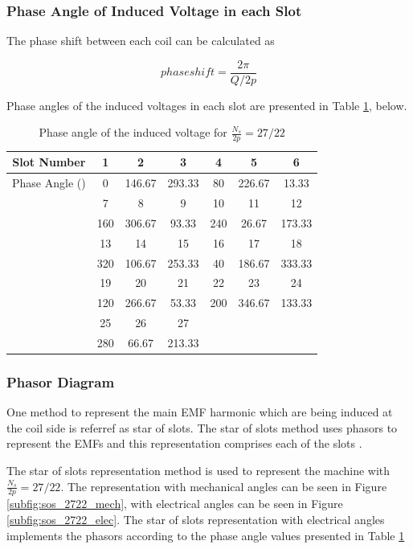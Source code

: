 \documentclass[a4paper, 11pt]{article}
\begin{document}
\subsubsection{Phase Angle of Induced Voltage in each Slot}

The phase shift between each coil can be calculated as

\begin{equation}
phase shift=\frac{2\pi}{Q/2p}
\end{equation}

Phase angles of the induced voltages in each slot are presented in Table \ref{tab:ph_ang_2722}, below.

\begin{table}[h!]
\centering
	\begin{tabular}{||c|| c c c c c c||} 
		\hline\hline
		Slot Number & 1 & 2 & 3 & 4 & 5 & 6\\ [0.5ex] 
		\hline
		Phase Angle (\degree) & 0 & 146.67 & 293.33 & 80 & 226.67 & 13.33\\ 
		\hline\hline
		& 7 & 8 & 9 & 10 & 11 & 12\\
		\hline
		& 160 & 306.67 & 93.33 & 240 & 26.67 & 173.33\\
		\hline\hline
		& 13 & 14 & 15 & 16 & 17 & 18\\
		\hline
		& 320 & 106.67 & 253.33 & 40 & 186.67 & 333.33\\
	 	\hline\hline
		& 19 & 20 & 21 & 22 & 23 & 24\\
		\hline
		& 120 & 266.67 & 53.33 & 200 & 346.67 & 133.33\\
		\hline\hline
		& 25 & 26 & 27\\
		\hline
		& 280 & 66.67 & 213.33\\
		\hline\hline
	\end{tabular}
	\caption{Phase angle of the induced voltage for $\frac{N_s}{2p}=27/22$}
	\label{tab:ph_ang_2722}
\end{table}


\subsubsection{Phasor Diagram}
\label{subsubsec:phasor_d_2722}

One method to represent the main EMF harmonic which are being induced at the coil side is referref as star of slots. The star of slots method uses phasors to represent the EMFs and this representation comprises each of the slots \cite{bianchi}.

The star of slots representation method is used to represent the machine with $\frac{N_s}{2p}=27/22$. The representation with mechanical angles can be seen in Figure \ref{subfig:sos_2722_mech}, with electrical angles can be seen in Figure \ref{subfig:sos_2722_elec}. The star of slots representation with electrical angles implements the phasors according to the phase angle values presented in Table \ref{tab:ph_ang_2722}
\end{document}
